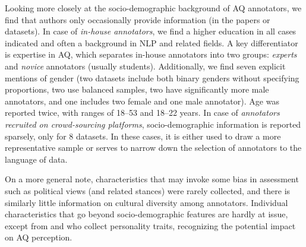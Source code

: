 Looking more closely at the socio-demographic background of AQ annotators, we find that authors only occasionally provide information (in the papers or datasets). In case of \textit{in-house annotators}, we find a higher education in all cases indicated and often a background in NLP and related fields. A key differentiator is expertise in AQ, which separates in-house annotators into two groups: \textit{experts} and \textit{novice} annotators (usually students). Additionally, we find seven explicit mentions of gender (two datasets include both binary genders without specifying proportions, two use balanced samples, two have significantly more male annotators, and one includes two female and one male annotator). Age was reported twice, with ranges of 18--53 and 18--22 years. In case of \textit{annotators recruited on crowd-sourcing platforms}, socio-demographic information is reported sparsely, only for 8 datasets. In these cases, it is either used to draw a more representative sample or serves to narrow down the selection of annotators to the language of data.

On a more general note, characteristics that may invoke some bias in assessment such as political views (and related stances) were rarely collected, and there is similarly little information on cultural diversity among annotators. Individual characteristics that go beyond socio-demographic features are hardly at issue, except from \citet{lukin-etal-2017-argument} and \citet{el-baff-etal-2018-challenge} who collect personality traits, recognizing the potential impact on AQ perception.

